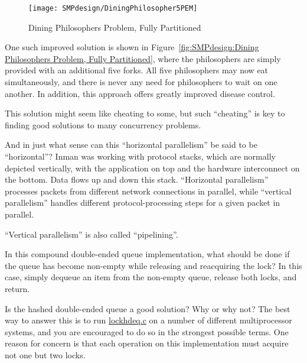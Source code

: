 \begin{enumerate}
\begin{figure}[tb]
\begin{center}
\texttt{[image: SMPdesign/DiningPhilosopher5PEM]}
\end{center}
\caption{Dining Philosophers Problem, Fully Partitioned}
\end{figure}

	One such improved solution is shown in
	Figure~\ref{fig:SMPdesign:Dining Philosophers Problem, Fully Partitioned},
	where the philosophers are simply provided with an additional
	five forks.
	All five philosophers may now eat simultaneously, and there
	is never any need for philosophers to wait on one another.
	In addition, this approach offers greatly improved disease control.

	This solution might seem like cheating to some, but such
	``cheating'' is key to finding good solutions to many
	concurrency problems.

\QuickQ{}
	And in just what sense can this ``horizontal parallelism'' be
	said to be ``horizontal''?
\QuickA{}
	Inman was working with protocol stacks, which are normally
	depicted vertically, with the application on top and the
	hardware interconnect on the bottom.
	Data flows up and down this stack.
	``Horizontal parallelism'' processes packets from different network
	connections in parallel, while ``vertical parallelism''
	handles different protocol-processing steps for a given
	packet in parallel.

	``Vertical parallelism'' is also called ``pipelining''.

\QuickQ{}
	In this compound double-ended queue implementation, what should
	be done if the queue has become non-empty while releasing
	and reacquiring the lock?
\QuickA{}
	In this case, simply dequeue an item from the non-empty
	queue, release both locks, and return.

\QuickQ{}
	Is the hashed double-ended queue a good solution?
	Why or why not?
\QuickA{}
	The best way to answer this is to run \url{lockhdeq.c} on
	a number of different multiprocessor systems, and you are
	encouraged to do so in the strongest possible terms.
	One reason for concern is that each operation on this
	implementation must acquire not one but two locks.


\end{enumerate}
